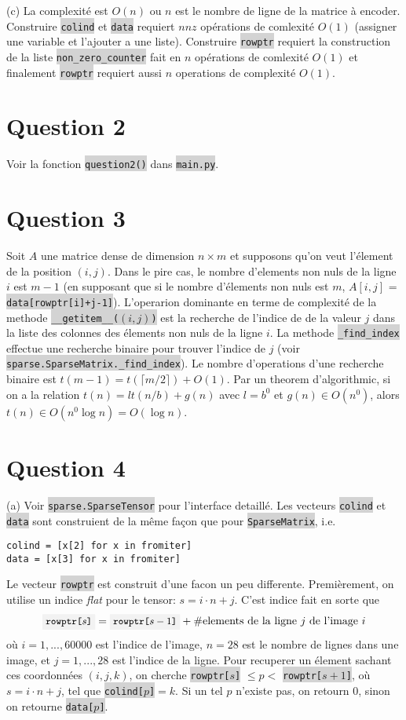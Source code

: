 \documentclass[10pt]{article}
\newcommand{\code}[1]{{\small\colorbox{LightGray}{\texttt{#1}}}}
\begin{document}
(c) La complexité est $O(n)$ ou $n$ est le nombre de ligne de la matrice à encoder. Construire \code{colind} et \code{data} requiert $nnz$ opérations de comlexité $O(1)$ (assigner une variable et l'ajouter a une liste). Construire \code{rowptr} requiert la construction de la liste \code{non\_zero\_counter} fait en $n$ opérations de comlexité $O(1)$ et finalement \code{rowptr} requiert aussi $n$ operations de complexité $O(1)$.


\section*{Question 2} 
Voir la fonction \code{question2()} dans \code{main.py}.

\section*{Question 3}
Soit $A$ une matrice dense de dimension $n\times m$ et supposons qu'on veut l'élement de la position $(i,j)$. Dans le pire cas, le nombre d'elements non nuls de la ligne $i$ est $m-1$ (en supposant que si le nombre d'élements non nuls est $m$, $A[i,j]$ = \code{data[rowptr[i]+j-1]}). L'operarion dominante en terme de complexité de la methode \code{\_\_getitem\_\_($(i,j)$)} est la recherche de l'indice de de la valeur $j$ dans la liste des colonnes des élements non nuls de la ligne $i$. La methode \code{\_find\_index} effectue une recherche binaire pour trouver l'indice de $j$ (voir \code{sparse.SparseMatrix.\_find\_index}). Le nombre d'operations d'une recherche binaire est $t(m-1)=t(\lceil m/2\rceil) + O(1)$. Par un theorem d'algorithmic, si on a la relation $t(n)=lt(n/b)+g(n)$ avec $l=b^0$ et $g(n)\in O(n^0)$, alors $t(n)\in O(n^0\log n)=O(\log n)$.

\section*{Question 4}
(a) Voir \code{sparse.SparseTensor} pour l'interface detaillé. Les vecteurs \code{colind} et \code{data} sont construient de la même façon que pour \code{SparseMatrix}, i.e.
\begin{verbatim}
colind = [x[2] for x in fromiter] 
data = [x[3] for x in fromiter] 
\end{verbatim}
Le vecteur \code{rowptr} est construit d'une facon un peu differente. Premièrement, on utilise un indice \textit{flat} pour le tensor: $s = i\cdot n + j$. C'est indice fait en sorte que
\[
	\code{rowptr[$s$]} = \code{rowptr[$s-1$]} + \#\text{elements de la ligne $j$ de l'image $i$}
\]
où $i=1,...,60000$ est l'indice de l'image, $n=28$ est le nombre de lignes dans une image, et $j=1,...,28$ est l'indice de la ligne. Pour recuperer un élement sachant ces coordonnées $(i, j, k)$, on cherche \code{rowptr[$s$]} $\leq p<$ \code{rowptr[$s+1$]}, où $s=i\cdot n+j$, tel que \code{colind[$p$]}$=k$. Si un tel $p$ n'existe pas, on retourn 0, sinon on retourne \code{data[$p$]}.\\
\end{document}
